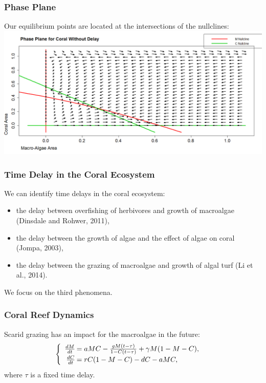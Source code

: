 \begin{frame}\frametitle{Phase Plane} 

  Our equilibrium points are located at the intersections of the nullclines:\\
  \includegraphics[scale=.2]{./nullclines.png}

\end{frame}



\begin{frame}
\frametitle{Time Delay in the Coral Ecosystem}

We can identify time delays in the coral ecosystem:
\begin{itemize}
\item the delay between overfishing of herbivores and growth of
  macroalgae (Dinsdale and Rohwer, 2011),
\item the delay between the growth of algae and the effect of algae on
  coral (Jompa, 2003),
\item the delay between the grazing of macroalgae and growth of algal
  turf (Li et al., 2014).
\end{itemize} We focus on the third phenomena.

\end{frame}


\begin{frame}\frametitle{Coral Reef Dynamics}
Scarid grazing has an impact for the macroalgae in the future:
$$\begin{cases}
  \begin{array}{rl}
    \frac{dM}{dt}\hspace{-.8em}&=aMC - \frac{gM(t-\tau)}{1-C(t-\tau)} + \gamma M (1-M-C),\\
    \frac{dC}{dt}\hspace{-.8em}&=rC(1-M-C) - dC - aMC,\\
  \end{array}
\end{cases}$$ where $\tau$ is a fixed time delay.
\end{frame}


